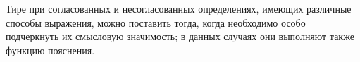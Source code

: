 \documentclass[main]{subfiles}
\begin{document}
Тире при согласованных и несогласованных определениях, имеющих различные способы выражения, можно поставить тогда, когда необходимо особо подчеркнуть их смысловую значимость; в данных случаях они выполняют также функцию пояснения.

\end{document}
